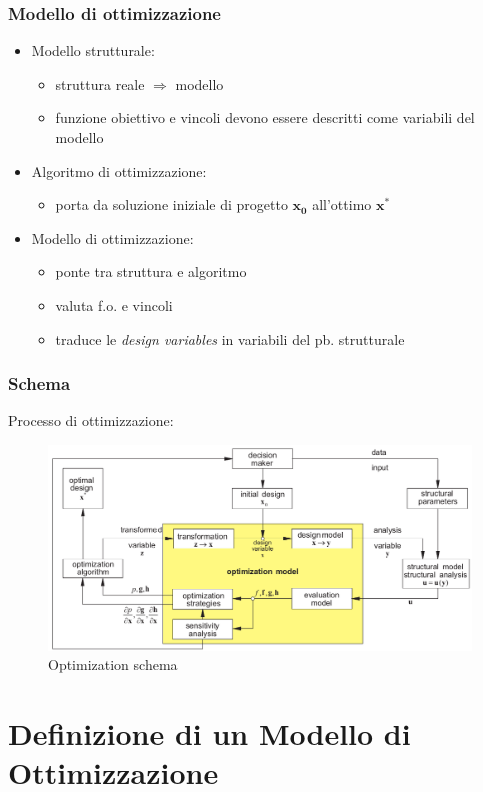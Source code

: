 \documentclass{beamer}
\begin{document}
\begin{frame}
	\frametitle{Modello di ottimizzazione}
	\begin{itemize}
		\item Modello strutturale:
			\begin{itemize}
				\item struttura reale $\Rightarrow$ modello
				\item funzione obiettivo e vincoli devono essere descritti come variabili del modello
			\end{itemize}
		\item Algoritmo di ottimizzazione:
			\begin{itemize}
				\item porta da soluzione iniziale di progetto $\mathbf{x_0}$ all'ottimo $\mathbf{x^*}$
			\end{itemize}
		\item Modello di ottimizzazione:
			\begin{itemize}
				\item ponte tra struttura e algoritmo
				\item valuta f.o. e vincoli
				\item traduce le \textit{design variables} in variabili del pb.  strutturale  
			\end{itemize}
	\end{itemize}
	
\end{frame}


\begin{frame}
	\frametitle{Schema}
	Processo di ottimizzazione:
	\begin{figure}
		\includegraphics[width=0.8\linewidth]{./images/schema.png}
		\caption{Optimization schema \cite{eschenauer1997applied}}
		\label{fig:schema}
	\end{figure}
\end{frame}


\section{Definizione di un Modello di Ottimizzazione}
\end{document}
